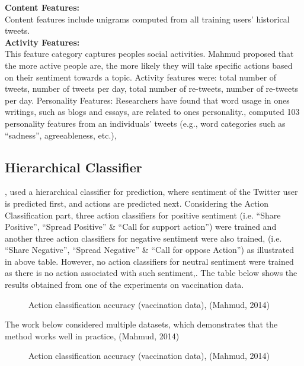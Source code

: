 \textbf{Content Features:} \\
Content features include unigrams computed from all training users' historical
tweets.\\
\textbf{Activity Features:}\\
This feature category captures people\textquotesingle s social activities. Mahmud proposed that
the more active people are, the more likely they will take specific actions based on their sentiment
towards a topic. Activity features were: total number of tweets, number of tweets per day, total
number of re-tweets, number of re-tweets per day.
Personality Features: Researchers have found that word usage in one\textquotesingle s writings, such as
blogs and essays, are related to one\textquotesingle s personality.\cite{ref38}, computed 103 personality
features from an individuals' tweets (e.g., word categories such as “sadness”, agreeableness, etc.),
\leavevmode\\

\subsection{Hierarchical Classifier}
\cite{ref38}, used a hierarchical classifier for prediction, where sentiment of the Twitter user
is predicted first, and actions are predicted next. Considering the Action Classification part, three
action classifiers for positive sentiment (i.e. “Share Positive”, “Spread Positive” \& “Call for
support action”) were trained and another three action classifiers for negative sentiment were also
trained, (i.e. “Share Negative”, “Spread Negative” \& “Call for oppose Action”) as illustrated in
above table. However, no action classifiers for neutral sentiment were trained as there is no action
associated with such sentiment,\cite{ref38}. The table below shows the results obtained from
one of the experiments on vaccination data.


\begin{figure}[h]
  \centering
  \caption[Example figure]%
  {Action classification accuracy (vaccination data), (Mahmud, 2014)}
  \label{fig:ALAP:sm1}
\end{figure}


The work below considered multiple datasets, which demonstrates that the method works well in
practice, (Mahmud, 2014)

\begin{figure}[h]
  \centering
  \caption[Example figure]%
  {Action classification accuracy (vaccination data), (Mahmud, 2014)}
  \label{fig:ALAP:sm1}
\end{figure}



